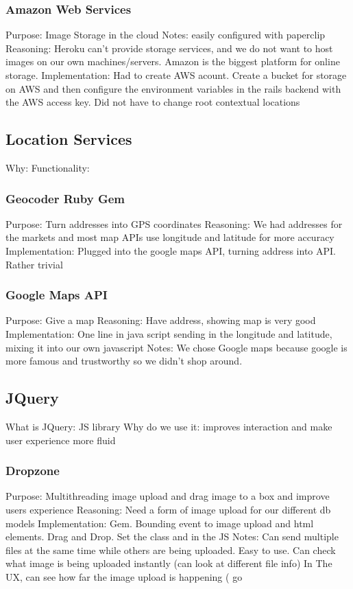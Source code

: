 \documentclass[10pt, a4paper, twocolumn]{article} %
\begin{document}
\subsubsection{Amazon Web Services}
Purpose: Image Storage in the cloud
Notes: easily configured with paperclip
Reasoning: Heroku can't provide storage services, and we do not want to host images on our own machines/servers. Amazon is the biggest platform for online storage.
Implementation:  Had to create AWS acount. Create a bucket for storage on AWS and then configure the environment variables in the rails backend with the AWS access key. Did not have to change root contextual locations


\subsection{Location Services}
Why:
Functionality:

\subsubsection{Geocoder Ruby Gem}
Purpose: Turn addresses into GPS coordinates
Reasoning: We had addresses for the markets and most map APIs use longitude and latitude for more accuracy
Implementation: Plugged into the google maps API, turning address into API. Rather trivial
\subsubsection{Google Maps API}
Purpose: Give a map 
Reasoning: Have address, showing map is very good
Implementation: One line in java script sending in the longitude and latitude, mixing it into our own javascript
Notes: We chose Google maps because google is more famous and trustworthy so we didn't shop around.
\subsection{JQuery}
What is JQuery: JS library
Why do we use it: improves interaction and make user experience more fluid
\subsubsection{Dropzone}
Purpose: Multithreading image upload and drag image to a box and improve users experience
Reasoning: Need a form of image upload for our different db models
Implementation: Gem. Bounding event to image upload and html elements. Drag and Drop. Set the class and in the JS
Notes: Can send multiple files at the same time while others are being uploaded. Easy to use. Can check what image is being uploaded instantly (can look at different file info) In The UX, can see how far the image upload is happening ( go 
\end{document}
